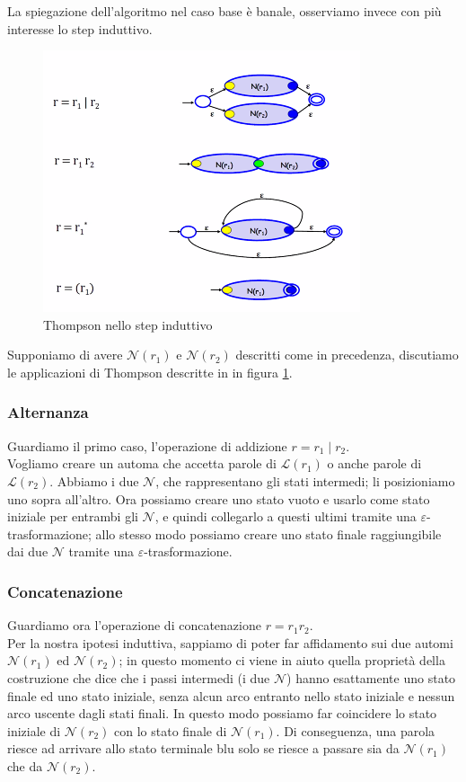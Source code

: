 \documentclass[class=book, crop=false, oneside, 12pt]{standalone}
\begin{document}
\noindent La spiegazione dell'algoritmo nel caso base è banale, osserviamo invece con più interesse lo step induttivo.

\begin{figure}
    \centering
    \includegraphics[width=.7\textwidth,keepaspectratio]{Thompson_step}
    \caption{Thompson nello step induttivo}
    \label{Thompson_step}
\end{figure}
Supponiamo di avere \(\mathcal{N}(r_1)\) e \(\mathcal{N}(r_2)\) descritti come in precedenza, discutiamo le applicazioni di Thompson descritte in in figura \ref{Thompson_step}.

\subsubsection{Alternanza}
Guardiamo il primo caso, l'operazione di addizione \(r = r_1 \mid r_2\).\\
Vogliamo creare un automa che accetta parole di \(\mathcal{L}(r_1)\) o anche parole di \(\mathcal{L}(r_2)\).
Abbiamo i due \(\mathcal{N}\), che rappresentano gli stati intermedi; li posizioniamo uno sopra all’altro. Ora possiamo creare uno stato vuoto e usarlo come stato iniziale per entrambi gli \(\mathcal{N}\), e quindi collegarlo a questi ultimi tramite una \(\varepsilon\)-trasformazione; allo stesso modo possiamo creare uno stato finale raggiungibile dai due \(\mathcal{N}\) tramite una \(\varepsilon\)-trasformazione.

\subsubsection{Concatenazione}
Guardiamo ora l’operazione di concatenazione \(r = r_1 r_2\).\\
Per la nostra ipotesi induttiva, sappiamo di poter far affidamento sui due automi \(\mathcal{N}(r_1)\) ed \(\mathcal{N}(r_2)\); in questo momento ci viene in aiuto quella proprietà della costruzione che dice che i passi intermedi (i due \(\mathcal{N}\)) hanno esattamente uno stato finale ed uno stato iniziale, senza alcun arco entranto nello stato iniziale e nessun arco uscente dagli stati finali. 
In questo modo possiamo far coincidere lo stato iniziale di \(\mathcal{N}(r_2)\) con lo stato finale di \(\mathcal{N}(r_1)\). 
Di conseguenza, una parola riesce ad arrivare allo stato terminale blu solo se riesce a passare sia da \(\mathcal{N}(r_1)\) che da \(\mathcal{N}(r_2)\).
\end{document}
